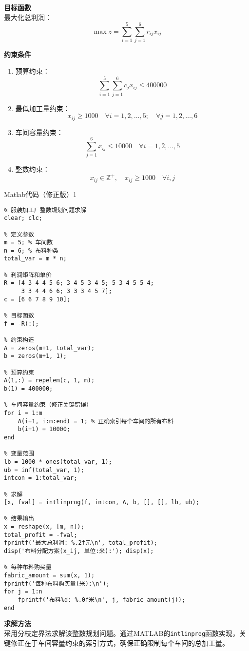 \textbf{目标函数}\\
最大化总利润：
\[
\max z = \sum_{i=1}^5 \sum_{j=1}^6 r_{ij} x_{ij}
\]

\textbf{约束条件}
\begin{enumerate}
    \item 预算约束：
    \[
    \sum_{i=1}^5 \sum_{j=1}^6 c_j x_{ij} \leq 400000
    \]
    \item 最低加工量约束：
    \[
    x_{ij} \geq 1000 \quad \forall i = 1, 2, \ldots, 5; \quad \forall j = 1, 2, \ldots, 6
    \]
    \item 车间容量约束：
    \[
    \sum_{j=1}^6 x_{ij} \leq 10000 \quad \forall i = 1, 2, \ldots, 5
    \]
    \item 整数约束：
    \[
    x_{ij} \in \mathbb{Z}^+, \quad x_{ij} \geq 1000 \quad \forall i, j
    \]
\end{enumerate}

\begin{codebox}{Matlab代码（修正版）}{1}
\begin{verbatim}
% 服装加工厂整数规划问题求解
clear; clc;

% 定义参数
m = 5; % 车间数
n = 6; % 布料种类
total_var = m * n;

% 利润矩阵和单价
R = [4 3 4 4 5 6; 3 4 5 3 4 5; 5 3 4 5 5 4; 
     3 3 4 4 6 6; 3 3 3 4 5 7];
c = [6 6 7 8 9 10];

% 目标函数
f = -R(:);

% 约束构造
A = zeros(m+1, total_var);
b = zeros(m+1, 1);

% 预算约束
A(1,:) = repelem(c, 1, m);
b(1) = 400000;

% 车间容量约束（修正关键错误）
for i = 1:m
    A(i+1, i:m:end) = 1; % 正确索引每个车间的所有布料
    b(i+1) = 10000;
end

% 变量范围
lb = 1000 * ones(total_var, 1);
ub = inf(total_var, 1);
intcon = 1:total_var;

% 求解
[x, fval] = intlinprog(f, intcon, A, b, [], [], lb, ub);

% 结果输出
x = reshape(x, [m, n]);
total_profit = -fval;
fprintf('最大总利润: %.2f元\n', total_profit);
disp('布料分配方案(x_ij, 单位:米):'); disp(x);

% 每种布料购买量
fabric_amount = sum(x, 1);
fprintf('每种布料购买量(米):\n');
for j = 1:n
    fprintf('布料%d: %.0f米\n', j, fabric_amount(j));
end
\end{verbatim}
\end{codebox}

\textbf{求解方法}\\
采用分枝定界法求解该整数规划问题。通过MATLAB的\texttt{intlinprog}函数实现，关键修正在于车间容量约束的索引方式，确保正确限制每个车间的总加工量。

